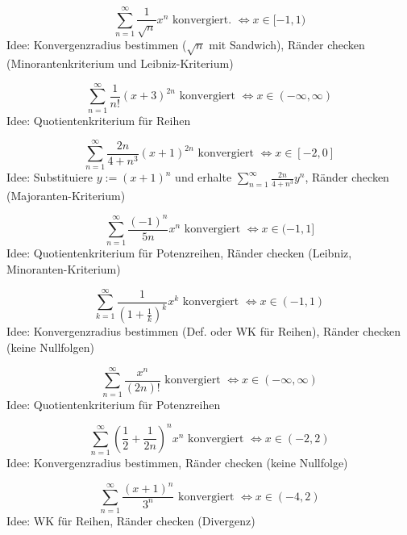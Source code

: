 \begin{displaymath}
  \sum_{n = 1}^{\infty} \frac{1}{\sqrt{n}} x^n \text{ konvergiert. } \iff x \in [-1, 1)
\end{displaymath}
Idee: Konvergenzradius bestimmen ($\sqrt{n}$ mit Sandwich), Ränder checken (Minorantenkriterium und Leibniz-Kriterium)

\begin{displaymath}
  \sum_{n = 1}^{\infty} \frac{1}{n!} (x+3)^{2n} \text{ konvergiert } \iff x \in (-\infty, \infty)
\end{displaymath}
Idee: Quotientenkriterium für Reihen

\begin{displaymath}
  \sum_{n = 1}^{\infty} \frac{2n}{4+n^3}(x+1)^{2n} \text{ konvergiert } \iff x \in [-2, 0]
\end{displaymath}
Idee: Substituiere $y := (x+1)^n$ und erhalte $\sum_{n = 1}^{\infty} \frac{2n}{4 + n^3}y^n$, Ränder checken (Majoranten-Kriterium)

\begin{displaymath}
  \sum_{n = 1}^{\infty} \frac{(-1)^n}{5n} x^n \text{ konvergiert } \iff x \in (-1, 1]
\end{displaymath}
Idee: Quotientenkriterium für Potenzreihen, Ränder checken (Leibniz, Minoranten-Kriterium)

\begin{displaymath}
  \sum_{k = 1}^{\infty} \frac{1}{\left(1 + \frac{1}{k}\right)^k} x^k \text{ konvergiert } \iff x \in (-1,1)
\end{displaymath}
Idee: Konvergenzradius bestimmen (Def. oder WK für Reihen), Ränder checken (keine Nullfolgen)

\begin{displaymath}
  \sum_{n = 1}^{\infty} \frac{x^n}{(2n)!} \text{ konvergiert } \iff x \in (-\infty, \infty)
\end{displaymath}
Idee: Quotientenkriterium für Potenzreihen

\begin{displaymath}
  \sum_{n = 1}^{\infty} \left(\frac{1}{2} + \frac{1}{2n}\right)^n x^n \text{ konvergiert } \iff x \in (-2,2)
\end{displaymath}
Idee: Konvergenzradius bestimmen, Ränder checken (keine Nullfolge)

\begin{displaymath}
  \sum_{n = 1}^{\infty} \frac{(x+1)^n}{3^n} \text{ konvergiert } \iff x \in (-4, 2)
\end{displaymath} 
Idee: WK für Reihen, Ränder checken (Divergenz)

